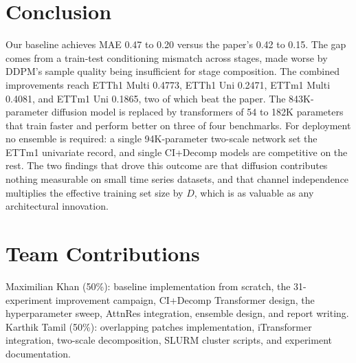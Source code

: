 \documentclass[conference]{IEEEtran}
\begin{document}
\section{Conclusion}
Our baseline achieves MAE 0.47 to 0.20 versus the paper's 0.42 to 0.15. The gap comes from a train-test conditioning mismatch across stages, made worse by DDPM's sample quality being insufficient for stage composition. The combined improvements reach ETTh1 Multi 0.4773, ETTh1 Uni 0.2471, ETTm1 Multi 0.4081, and ETTm1 Uni 0.1865, two of which beat the paper. The 843K-parameter diffusion model is replaced by transformers of 54 to 182K parameters that train faster and perform better on three of four benchmarks. For deployment no ensemble is required: a single 94K-parameter two-scale network set the ETTm1 univariate record, and single CI+Decomp models are competitive on the rest. The two findings that drove this outcome are that diffusion contributes nothing measurable on small time series datasets, and that channel independence multiplies the effective training set size by $D$, which is as valuable as any architectural innovation.

\section*{Team Contributions}
Maximilian Khan (50\%): baseline implementation from scratch, the 31-experiment improvement campaign, CI+Decomp Transformer design, the hyperparameter sweep, AttnRes integration, ensemble design, and report writing. Karthik Tamil (50\%): overlapping patches implementation, iTransformer integration, two-scale decomposition, SLURM cluster scripts, and experiment documentation.



\end{document}
